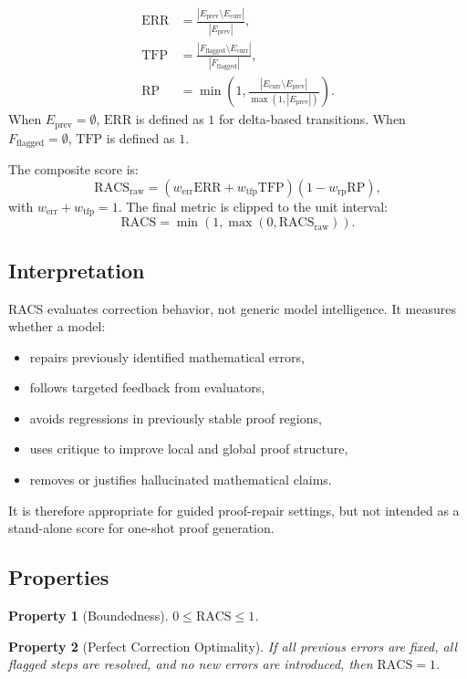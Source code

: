 \documentclass[conference]{IEEEtran}
\newtheorem{property}{Property}
\newcommand{\RACS}{\mathrm{RACS}}
\newcommand{\ERR}{\mathrm{ERR}}
\newcommand{\TFP}{\mathrm{TFP}}
\newcommand{\RP}{\mathrm{RP}}
\newcommand{\Eprev}{E_{\mathrm{prev}}}
\newcommand{\Ecurr}{E_{\mathrm{curr}}}
\newcommand{\Fflag}{F_{\mathrm{flagged}}}
\begin{document}
\begin{align}
    \ERR &= \frac{|\Eprev \setminus \Ecurr|}{|\Eprev|}, \\
    \TFP &= \frac{|\Fflag \setminus \Ecurr|}{|\Fflag|}, \\
    \RP &= \min\left(1,\frac{|\Ecurr \setminus \Eprev|}{\max(1,|\Eprev|)}\right).
\end{align}
When $\Eprev=\emptyset$, $\ERR$ is defined as $1$ for delta-based transitions. When $\Fflag=\emptyset$, $\TFP$ is defined as $1$.

The composite score is:
\begin{equation}
    \RACS_{\mathrm{raw}}
    =
    (w_{\mathrm{err}}\ERR + w_{\mathrm{tfp}}\TFP)
    (1 - w_{\mathrm{rp}}\RP),
\end{equation}
with $w_{\mathrm{err}}+w_{\mathrm{tfp}}=1$. The final metric is clipped to the unit interval:
\begin{equation}
    \RACS = \min(1,\max(0,\RACS_{\mathrm{raw}})).
\end{equation}

\subsection{Interpretation}
RACS evaluates correction behavior, not generic model intelligence. It measures whether a model:
\begin{itemize}
    \item repairs previously identified mathematical errors,
    \item follows targeted feedback from evaluators,
    \item avoids regressions in previously stable proof regions,
    \item uses critique to improve local and global proof structure,
    \item removes or justifies hallucinated mathematical claims.
\end{itemize}
It is therefore appropriate for guided proof-repair settings, but not intended as a stand-alone score for one-shot proof generation.

\subsection{Properties}
\begin{property}[Boundedness]
$0 \le \RACS \le 1$.
\end{property}

\begin{property}[Perfect Correction Optimality]
If all previous errors are fixed, all flagged steps are resolved, and no new errors are introduced, then $\RACS=1$.
\end{property}
\end{document}
